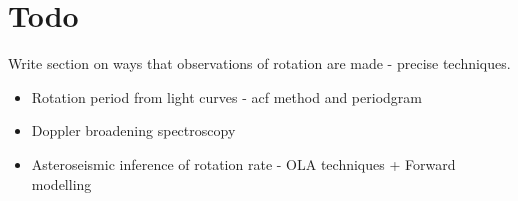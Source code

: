 \section{Todo}
Write section on ways that observations of rotation are made - precise techniques.
\begin{itemize}
    \item Rotation period from light curves - acf method and periodgram
    \item Doppler broadening spectroscopy
    \item Asteroseismic inference of rotation rate - OLA techniques + Forward modelling
\end{itemize}

% 

